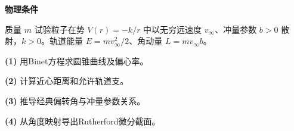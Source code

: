 \textbf{物理条件}\par 质量 \(m\) 试验粒子在势 \(V(r)=-k/r\) 中以无穷远速度 \(v_\infty\)、冲量参数 \(b>0\) 散射，\(k>0\)。轨道能量 \(E=m v_\infty^2/2\)、角动量 \(L=mv_\infty b\)。
\par\noindent\textbf{(1)} 用Binet方程求圆锥曲线及偏心率。
\par\noindent\textbf{(2)} 计算近心距离和允许轨道支。
\par\noindent\textbf{(3)} 推导经典偏转角与冲量参数关系。
\par\noindent\textbf{(4)} 从角度映射导出Rutherford微分截面。
